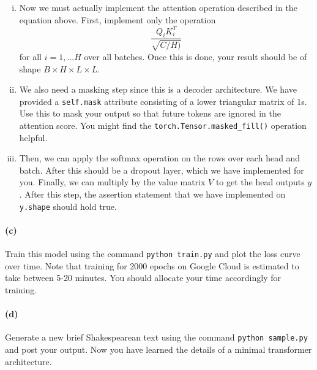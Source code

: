 \documentclass{exam}
\begin{document}
\begin{enumerate}[i.]
    \item Now we must actually implement the attention operation described in the equation above. First, implement only the operation 
    \begin{equation}
        \frac{Q_i K_i^T}{\sqrt{C/H)}}
    \end{equation} 
    for all $i = 1, \ldots H$ over all batches. Once this is done, your result should be of shape $B \times H \times L \times L$. 

    \item We also need a masking step since this is a decoder architecture. We have provided a \texttt{self.mask} attribute consisting of a lower triangular matrix of $1$s. Use this to mask your output so that future tokens are ignored in the attention score. You might find the \texttt{torch.Tensor.masked\_fill()} operation helpful. 

    \item Then, we can apply the softmax operation on the rows over each head and batch. After this should be a dropout layer, which we have implemented for you. Finally, we can multiply by the value matrix $V$ to get the head outputs $y$. After this step, the assertion statement that we have implemented on \texttt{y.shape} should hold true. 
\end{enumerate}


\paragraph{(c)} Train this model using the command \texttt{python train.py} and plot the loss curve over time. Note that training for 2000 epochs on Google Cloud is estimated to take between 5-20 minutes. You should allocate your time accordingly for training. 

\paragraph{(d)} Generate a new brief Shakespearean text using the command \texttt{python sample.py} and post your output. Now you have learned the details of a minimal transformer architecture. 

\newpage
\end{document}
